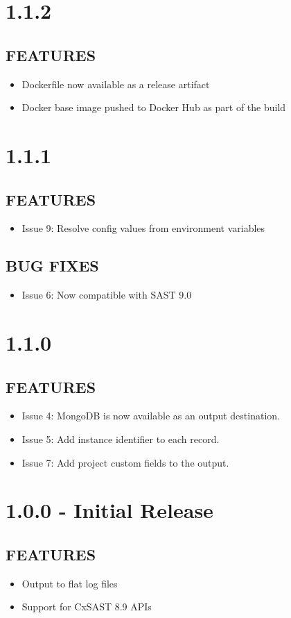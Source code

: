 \section{1.1.2}
\subsection*{FEATURES}
    \begin{itemize}
        \item Dockerfile now available as a release artifact
        \item Docker base image pushed to Docker Hub as part of the build 
    \end{itemize}

\section{1.1.1}
\subsection*{FEATURES}
    \begin{itemize}
        \item Issue 9: Resolve config values from environment variables        
    \end{itemize}
\subsection*{BUG FIXES}
    \begin{itemize}
        \item Issue 6: Now compatible with SAST 9.0
    \end{itemize}

\section{1.1.0}
\subsection*{FEATURES}
    \begin{itemize}
        \item Issue 4: MongoDB is now available as an output destination.
        \item Issue 5: Add instance identifier to each record.
        \item Issue 7: Add project custom fields to the output.
    \end{itemize}

\section{1.0.0 - Initial Release}
\subsection*{FEATURES}
    \begin{itemize}
        \item Output to flat log files
        \item Support for CxSAST 8.9 APIs
    \end{itemize}
